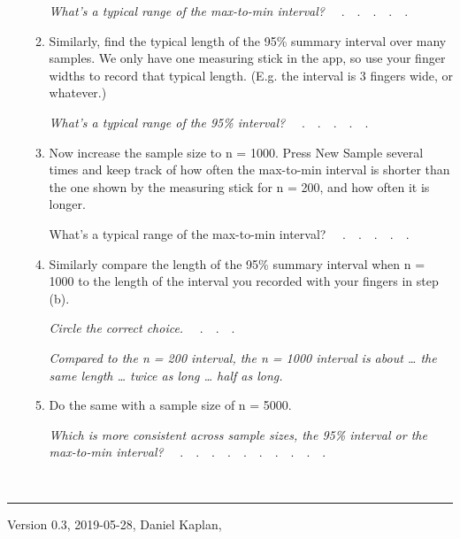\documentclass[nofonts,]{tufte-handout}
\begin{document}
\begin{enumerate}
\begin{enumerate}
    \emph{What's a typical range of the max-to-min interval?}
    ~~.~~.~~.~~.~~. ~
  \item
    Similarly, find the typical length of the 95\% summary interval over
    many samples. We only have one measuring stick in the app, so use
    your finger widths to record that typical length. (E.g. the interval
    is 3 fingers wide, or whatever.)

    \emph{What's a typical range of the 95\% interval?} ~~.~~.~~.~~.~~.
    ~
  \item
    Now increase the sample size to n = 1000. Press New Sample several
    times and keep track of how often the max-to-min interval is shorter
    than the one shown by the measuring stick for n = 200, and how often
    it is longer.

    What's a typical range of the max-to-min interval? ~~.~~.~~.~~.~~. ~
  \item
    Similarly compare the length of the 95\% summary interval when n =
    1000 to the length of the interval you recorded with your fingers in
    step (b).

    \emph{Circle the correct choice.} ~~.~~.~~.

    \emph{Compared to the n = 200 interval, the n = 1000 interval is
    about \ldots{} the same length \ldots{} twice as long \ldots{} half
    as long.}
  \item
    Do the same with a sample size of n = 5000.

    \emph{Which is more consistent across sample sizes, the 95\%
    interval or the max-to-min interval?} ~~.~~.~~.~~.~~.~~.~~.~~.~~.~~.
    ~
  \end{enumerate}

  ~
\end{enumerate}

\begin{center}\rule{0.5\linewidth}{\linethickness}\end{center}

Version 0.3, 2019-05-28, Daniel Kaplan,
\end{document}
